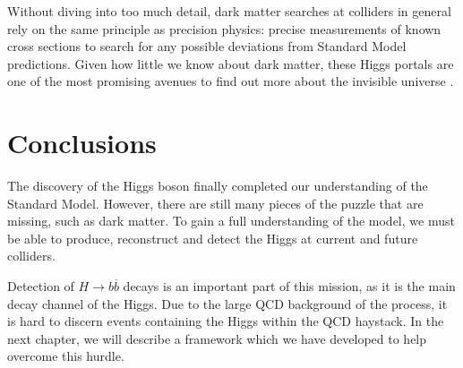 \documentclass[10pt,a4paper]{book}
\begin{document}
Without diving into too much detail, dark matter searches at colliders in general rely on the same principle as precision physics: precise measurements of known cross sections to search for any possible deviations from Standard Model predictions. Given how little we know about dark matter, these Higgs portals are one of the most promising avenues to find out more about the invisible universe \cite{Arcadi:2019lka}.

\section{Conclusions}
The discovery of the Higgs boson finally completed our understanding of the Standard Model. However, there are still many pieces of the puzzle that are missing, such as dark matter. To gain a full understanding of the model, we must be able to produce, reconstruct and detect the Higgs at current and future colliders. 

Detection of $H\rightarrow b\overline{b}$ decays is an important part of this mission, as it is the main decay channel of the Higgs. Due to the large QCD background of the process, it is hard to discern events containing the Higgs within the QCD haystack. In the next chapter, we will describe a framework which we have developed to help overcome this hurdle.
\end{document}

